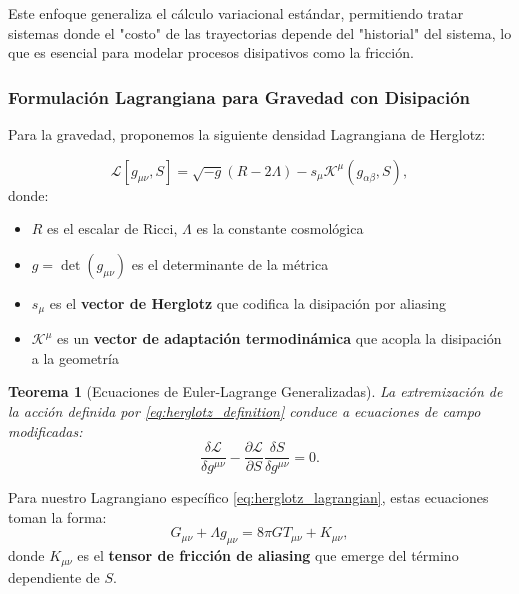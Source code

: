 \documentclass[12pt, a4paper]{article}
\theoremstyle{plain}
\newtheorem{teorema}{Teorema}
\theoremstyle{definition}
\begin{document}
Este enfoque generaliza el cálculo variacional estándar, permitiendo tratar sistemas donde el "costo" de las trayectorias depende del "historial" del sistema, lo que es esencial para modelar procesos disipativos como la fricción.

\subsubsection{Formulación Lagrangiana para Gravedad con Disipación}

Para la gravedad, proponemos la siguiente densidad Lagrangiana de Herglotz:

\begin{equation}
\mathcal{L}[g_{\mu\nu}, S] = \sqrt{-g}(R - 2\Lambda) - s_\mu \mathcal{K}^\mu(g_{\alpha\beta}, S),
\label{eq:herglotz_lagrangian}
\end{equation}
donde:
\begin{itemize}
    \item $R$ es el escalar de Ricci, $\Lambda$ es la constante cosmológica
    \item $g = \det(g_{\mu\nu})$ es el determinante de la métrica
    \item $s_\mu$ es el \textbf{vector de Herglotz} que codifica la disipación por aliasing
    \item $\mathcal{K}^\mu$ es un \textbf{vector de adaptación termodinámica} que acopla la disipación a la geometría
\end{itemize}

\begin{teorema}[Ecuaciones de Euler-Lagrange Generalizadas]
La extremización de la acción definida por \eqref{eq:herglotz_definition} conduce a ecuaciones de campo modificadas:
\begin{equation}
\frac{\delta\mathcal{L}}{\delta g^{\mu\nu}} - \frac{\partial\mathcal{L}}{\partial S} \frac{\delta S}{\delta g^{\mu\nu}} = 0.
\label{eq:generalized_euler_lagrange}
\end{equation}
\end{teorema}

Para nuestro Lagrangiano específico \eqref{eq:herglotz_lagrangian}, estas ecuaciones toman la forma:
\begin{equation}
G_{\mu\nu} + \Lambda g_{\mu\nu} = 8\pi G T_{\mu\nu} + K_{\mu\nu},
\label{eq:modified_field_eq}
\end{equation}
donde $K_{\mu\nu}$ es el \textbf{tensor de fricción de aliasing} que emerge del término dependiente de $S$.
\end{document}
